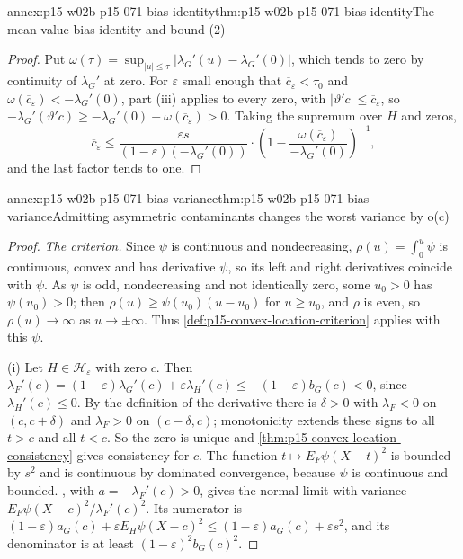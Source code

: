 \begin{annexitem}{annex:p15-w02b-p15-071-bias-identity}{thm:p15-w02b-p15-071-bias-identity}{The mean-value bias identity and bound (2)}
\begin{proof}
Put \(\omega(\tau)=\sup_{|u|\leq\tau}|\lambda_G'(u)-\lambda_G'(0)|\),
which tends to zero by continuity of \(\lambda_G'\) at zero.
For \(\varepsilon\) small enough that \(\overline c_\varepsilon<\tau_0\)
and \(\omega(\overline c_\varepsilon)<-\lambda_G'(0)\), part (iii)
applies to every zero, with \(|\vartheta'c|\leq\overline c_\varepsilon\),
so \(-\lambda_G'(\vartheta'c)\geq-\lambda_G'(0)-\omega(\overline c_\varepsilon)>0\).
Taking the supremum over \(H\) and zeros,
\[
 \overline c_\varepsilon\leq
 \frac{\varepsilon s}{(1-\varepsilon)(-\lambda_G'(0))}\cdot
 \left(1-\frac{\omega(\overline c_\varepsilon)}{-\lambda_G'(0)}\right)^{-1},
\]
and the last factor tends to one.
\end{proof}
\end{annexitem}

\begin{annexitem}{annex:p15-w02b-p15-071-bias-variance}{thm:p15-w02b-p15-071-bias-variance}{Admitting asymmetric contaminants changes the worst variance by o(c)}
\begin{proof}
\emph{The criterion.} Since \(\psi\) is continuous and nondecreasing,
\(\rho(u)=\int_0^u\psi\) is continuous, convex and has derivative
\(\psi\), so its left and right derivatives coincide with \(\psi\).
As \(\psi\) is odd, nondecreasing and not identically zero, some
\(u_0>0\) has \(\psi(u_0)>0\); then \(\rho(u)\geq\psi(u_0)(u-u_0)\) for
\(u\geq u_0\), and \(\rho\) is even, so \(\rho(u)\to\infty\) as
\(u\to\pm\infty\). Thus \cref{def:p15-convex-location-criterion}
applies with this \(\psi\).

(i) Let \(H\in\mathcal H_\varepsilon\) with zero \(c\). Then
\(\lambda_F'(c)=(1-\varepsilon)\lambda_G'(c)+\varepsilon\lambda_H'(c)
\leq-(1-\varepsilon)b_G(c)<0\), since \(\lambda_H'(c)\leq0\).
By the definition of the derivative there is \(\delta>0\) with
\(\lambda_F<0\) on \((c,c+\delta)\) and \(\lambda_F>0\) on
\((c-\delta,c)\); monotonicity extends these signs to all \(t>c\) and
all \(t<c\). So the zero is unique and
\cref{thm:p15-convex-location-consistency} gives consistency for \(c\).
The function \(t\mapsto E_F\psi(X-t)^2\) is bounded by \(s^2\) and is
continuous by dominated convergence, because \(\psi\) is continuous and
bounded. , with
\(a=-\lambda_F'(c)>0\), gives the normal limit with variance
\(E_F\psi(X-c)^2/\lambda_F'(c)^2\). Its numerator is
\((1-\varepsilon)a_G(c)+\varepsilon E_H\psi(X-c)^2\leq
(1-\varepsilon)a_G(c)+\varepsilon s^2\), and its denominator is at least
\((1-\varepsilon)^2b_G(c)^2\).


\end{proof}
\end{annexitem}
